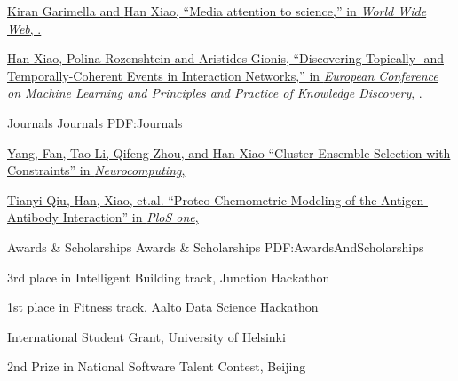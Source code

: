 \documentclass[letterpaper,MMMyyyy,nonstopmode]{simpleresumecv}
\begin{document}
\begin{Body}
\begingroup
\BigGap

\href{http://www.example.com/my-paper-doi-3}
{Kiran Garimella and \underline{Han Xiao}, 
``Media attention to science,''
in \textit{World Wide Web},
.}

\BigGap

\href{http://www.example.com/my-paper-doi-3}
{\underline{Han Xiao}, Polina Rozenshtein and Aristides Gionis, 
``Discovering Topically- and Temporally-Coherent Events in Interaction Networks,''
in \textit{European Conference on Machine Learning and Principles and Practice of Knowledge Discovery},
.}

\endgroup

\BigGap

\SubSection
{Journals}
{Journals}
{PDF:Journals}

\begingroup

\BigGap

\href{http://www.example.com/my-paper-doi-3}
{Yang, Fan, Tao Li, Qifeng Zhou, and \underline{Han Xiao}
  ``Cluster Ensemble Selection with Constraints''
  in \textit{Neurocomputing},
}

\BigGap

\href{http://www.example.com/my-paper-doi-3}
{Tianyi Qiu, \underline{Han, Xiao}, et.al.
  ``Proteo Chemometric Modeling of the Antigen-Antibody Interaction''
  in \textit{PloS one},
  }


\endgroup



\Section
{Awards \&\newline
Scholarships}
{Awards \& Scholarships}
{PDF:AwardsAndScholarships}

\BulletItem
3rd place in Intelligent Building track,
Junction Hackathon
\hfill
{}

\Gap

\BulletItem
1st place in Fitness track,
Aalto Data Science Hackathon
\hfill
{}

\Gap

\BulletItem
International Student Grant,
University of Helsinki
\hfill
{}

\Gap
\BulletItem
2nd Prize in National Software Talent Contest, 
Beijing
\hfill
{}


\end{Body}
\end{document}
